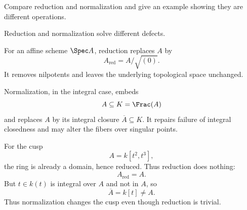 \begin{problem}\label{prob:vi28-17}
Compare reduction and normalization and give an example showing they are different operations.

\end{problem}

\ifdefined\FullProblemDossiers
\begin{solution}
Reduction and normalization solve different defects.

For an affine scheme \(\Spec A\), reduction replaces \(A\) by
\[
A_{\mathrm{red}}=A/\sqrt{(0)}.
\]
It removes nilpotents and leaves the underlying topological space unchanged.

Normalization, in the integral case, embeds
\[
A\subseteq K=\Frac(A)
\]
and replaces \(A\) by its integral closure \(\overline A\subseteq K\). It repairs failure of integral closedness and may alter the fibers over singular points.

For the cusp
\[
A=k[t^2,t^3],
\]
the ring is already a domain, hence reduced. Thus reduction does nothing:
\[
A_{\mathrm{red}}=A.
\]
But \(t\in k(t)\) is integral over \(A\) and not in \(A\), so
\[
\overline A=k[t]\ne A.
\]
Thus normalization changes the cusp even though reduction is trivial.
\end{solution}
\fi
